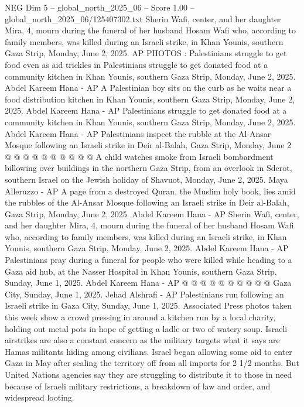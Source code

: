 \begin{textsample}{NEG Dim 5 – global\_north\_2025\_06 – Score 1.00 – global\_north\_2025\_06/125407302.txt}  \label{ex:f5_neg_379}
Sherin Wafi, center, and her daughter Mira, 4, mourn during the funeral of her husband Hosam Wafi who, according to family members, was killed during an Israeli strike, in Khan Younis, southern Gaza Strip, Monday, June 2, 2025.
AP PHOTOS : Palestinians struggle to get food even as aid trickles in Palestinians struggle to get donated food at a community kitchen in Khan Younis, southern Gaza Strip, Monday, June 2, 2025.
Abdel Kareem Hana - AP A Palestinian boy sits on the curb as he waits near a food distribution kitchen in Khan Younis, southern Gaza Strip, Monday, June 2, 2025.
Abdel Kareem Hana - AP Palestinians struggle to get donated food at a community kitchen in Khan Younis, southern Gaza Strip, Monday, June 2, 2025.
Abdel Kareem Hana - AP Palestinians inspect the rubble at the Al-Ansar Mosque following an Israeli strike in Deir al-Balah, Gaza Strip, Monday, June 2 @ @ @ @ @ @ @ @ @ @ A child watches smoke from Israeli bombardment billowing over buildings in the northern Gaza Strip, from an overlook in Sderot, southern Israel on the Jewish holiday of Shavuot, Monday, June 2, 2025.
Maya Alleruzzo - AP A page from a destroyed Quran, the Muslim holy book, lies amid the rubbles of the Al-Ansar Mosque following an Israeli strike in Deir al-Balah, Gaza Strip, Monday, June 2, 2025.
Abdel Kareem Hana - AP Sherin Wafi, center, and her daughter Mira, 4, mourn during the funeral of her husband Hosam Wafi who, according to family members, was killed during an Israeli strike, in Khan Younis, southern Gaza Strip, Monday, June 2, 2025.
Abdel Kareem Hana - AP Palestinians pray during a funeral for people who were killed while heading to a Gaza aid hub, at the Nasser Hospital in Khan Younis, southern Gaza Strip, Sunday, June 1, 2025.
Abdel Kareem Hana - AP @ @ @ @ @ @ @ @ @ @ Gaza City, Sunday, June 1, 2025.
Jehad Alshrafi - AP Palestinians run following an Israeli strike in Gaza City, Sunday, June 1, 2025.
Associated Press photos taken this week show a crowd pressing in around a kitchen run by a local charity, holding out metal pots in hope of getting a ladle or two of watery soup.
Israeli airstrikes are also a constant concern as the military targets what it says are Hamas militants hiding among civilians.
Israel began allowing some aid to enter Gaza in May after sealing the territory off from all imports for 2 1/2 months.
But United Nations agencies say they are struggling to distribute it to those in need because of Israeli military restrictions, a breakdown of law and order, and widespread looting.

\end{textsample}
